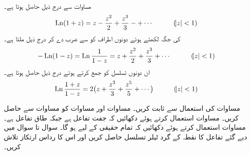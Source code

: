 \quad {}\\
مساوات  سے درج ذیل حاصل ہوتا ہے۔
\begin{align}
\operatorname{Ln} (1+z)=z-\frac{z^2}{2}+\frac{z^3}{3}-+\cdots\quad \quad \quad (\abs{z}<1)
\end{align}
 کی جگہ  لکھتے ہوئے دونوں اطراف کو  سے ضرب دے کر درج ذیل ملتا ہے۔
\begin{align}
-\operatorname{Ln}(1-z)=\operatorname{Ln} \frac{1}{1-z}=z+\frac{z^2}{2}+\frac{z^3}{3}+\cdots \quad \quad \quad (\abs{z}<1)
\end{align}
ان دونوں تسلسل کو جمع کرتے ہوئے درج ذیل حاصل ہوتا ہے۔
\begin{align}\label{مساوات_ٹیلر_لوگارتھمی_کسر}
\operatorname{Ln} \frac{1+z}{1-z}=2\big(z+\frac{z^3}{3}+\frac{z^5}{5}+\cdots\big)\quad \quad \quad (\abs{z}<1)
\end{align}

\quad مساوات  کی استعمال سے  ثابت کریں۔
\quad مساوات  اور مساوات  کو مساوات  سے حاصل کریں۔
\quad
مساوات  استعمال کرتے ہوئے دکھائیں کہ  جفت تفاعل ہے جبکہ  طاق تفاعل ہے۔ 
\quad
مساوات  استعمال کرتے ہوئے دکھائیں کہ تمام حقیقی  کے لیے  ہو گا۔
سوال  تا سوال  میں دیے گئے تفاعل کا نقطہ  کے گرد ٹیلر تسلسل حاصل کریں اور اس کا رداس ارتکاز  تلاش کریں۔

